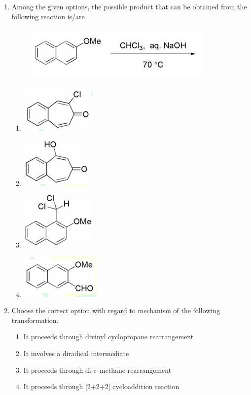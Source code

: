 \documentclass[journal,12pt,onecolumn]{IEEEtran}
\theoremstyle{remark}
\begin{document}
\begin{enumerate}
\item Among the given options, the possible product that can be obtained from the following reaction is/are
 \begin{figure}[H]
        \centering
        \includegraphics[width=0.4\columnwidth]{figs/q26.png}
        \caption*{}
        \label{fig:placeholder}
    \end{figure}
     \begin{multicols}{2}
    \begin{enumerate}
        \item \includegraphics[width=0.2\columnwidth]{figs/q26a.png}
        \item \includegraphics[width=0.2\columnwidth]{figs/q26b.png}
        \item \includegraphics[width=0.2\columnwidth]{figs/q26c.png}
        \item \includegraphics[width=0.2\columnwidth]{figs/q26d.png}
    \end{enumerate}      \hfill{}
    \end{multicols}



\item Choose the correct option with regard to mechanism of the following transformation.
    \begin{enumerate}
        \item It proceeds through divinyl cyclopropane rearrangement
        \item It involves a diradical intermediate
        \item It proceeds through di-$\pi$-methane rearrangement
        \item It proceeds through [2+2+2] cycloaddition reaction
    \end{enumerate}      \hfill{}




\end{enumerate}
\end{document}
